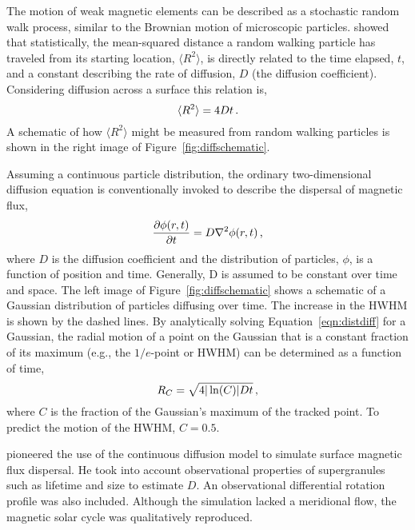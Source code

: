 The motion of weak magnetic elements can be described as a stochastic random walk process, similar to the Brownian motion of microscopic particles. \cite{Einstein:1905} showed that statistically, the mean-squared distance a random walking particle has traveled from its starting location, $\langle R^2 \rangle$, is directly related to the time elapsed, $t$, and a constant describing the rate of diffusion, $D$ (the diffusion coefficient). Considering diffusion across a surface this relation is,
\begin{equation}\label{eqn:einstein}
\langle R^2 \rangle=4Dt \mbox{\,.}
\end{equation}
A schematic of how $\langle R^2 \rangle$ might be measured from random walking particles is shown in the right image of Figure~\ref{fig:diffschematic}.

Assuming a continuous particle distribution, the ordinary two-dimensional diffusion equation is conventionally invoked to describe the dispersal of magnetic flux,
\begin{equation}\label{eqn:distdiff}
\frac{\partial \phi(r,t)}{\partial t} = D\nabla^2\phi(r,t) \mbox{\,,}
\end{equation}
where $D$ is the diffusion coefficient and the distribution of particles, $\phi$, is a function of position and time. Generally, D is assumed to be constant over time and space. %
The left image of Figure~\ref{fig:diffschematic} shows a schematic of a Gaussian distribution of particles diffusing over time. The increase in the \gls{HWHM} is shown by the dashed lines. By analytically solving Equation~\ref{eqn:distdiff} for a Gaussian, the radial motion of a point on the Gaussian that is a constant fraction of its maximum (e.g., the $1/e$-point or \gls{HWHM}) can be determined as a function of time,
\begin{equation}\label{eqn:hwhm}
R_{C} = \sqrt{4 |\ln(C)| D t} \mbox{\,,}
\end{equation}
where $C$ is the fraction of the Gaussian's maximum of the tracked point. To predict the motion of the \gls{HWHM}, $C = 0.5$.

\cite{Leighton:1964} pioneered the use of the continuous diffusion model to simulate surface magnetic flux dispersal. He took into account observational properties of supergranules such as  lifetime and size to estimate $D$. An observational differential rotation profile was also included. Although the simulation lacked a meridional flow, the magnetic solar cycle was qualitatively reproduced. 

